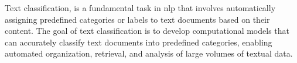 \label{02_text_classification}

Text classification, is a fundamental task in \gls{nlp} that involves automatically assigning predefined categories or labels to text documents based on their content. The goal of text classification is to develop computational models that can accurately classify text documents into predefined categories, enabling automated organization, retrieval, and analysis of large volumes of textual data.